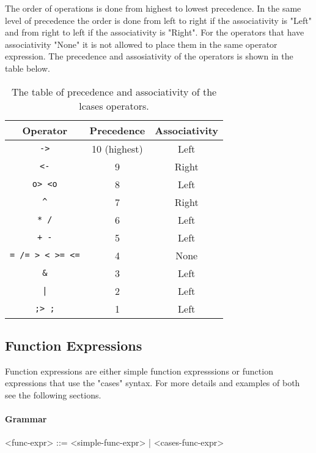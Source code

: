 \documentclass{article}
\begin{document}
The order of operations is done from highest to lowest precedence. In the same
level of precedence the order is done from left to right if the associativity
is "Left" and from right to left if the associativity is "Right". For the
operators that have associativity "None" it is not allowed to place them in the
same operator expression. The precedence and assosiativity of the operators
is shown in the table below.
\begin{table}[h!]

\caption{ The table of precedence and associativity of the lcases operators.  }

\begin{center}
\begin{tabular}{ |c|c|c| } 
\hline
Operator & Precedence & Associativity \\ 
\hline
\hline
\texttt{->} & 10 (highest) & Left \\
\hline
\texttt{<-} & 9 & Right \\
\hline
\texttt{o> <o} & 8 & Left \\
\hline
\texttt{\^} & 7 & Right \\
\hline
\texttt{* /} & 6 & Left \\
\hline
\texttt{+ -} & 5 & Left \\ 
\hline
\texttt{= /= > < >= <=} & 4 & None \\
\hline
\texttt{\&} & 3 & Left \\
\hline
\texttt{|} & 2 & Left \\
\hline
\texttt{;> ;} & 1 & Left \\
\hline
\end{tabular}
\end{center}

\label{table:precassoc}

\end{table}

\newpage
\subsection{Function Expressions}

Function expressions are either simple function expresssions or
function expressions that use the "cases" syntax. For more details and examples of
both see the following sections.

\paragraph{Grammar}
\begin{grammar}
<func-expr> ::= <simple-func-expr> | <cases-func-expr>
\end{grammar}
\end{document}
